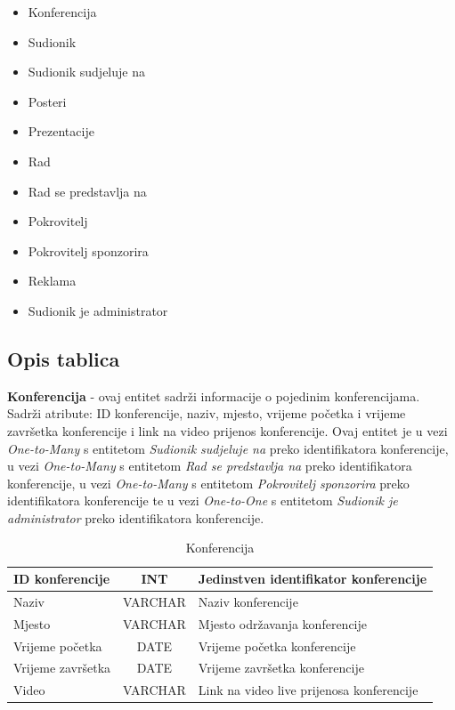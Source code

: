 \begin{itemize}
	\item Konferencija
	\item Sudionik
	\item Sudionik sudjeluje na
	\item Posteri
	\item Prezentacije
	\item Rad
	\item Rad se predstavlja na
	\item Pokrovitelj
	\item Pokrovitelj sponzorira
	\item Reklama
	\item Sudionik je administrator
\end{itemize}
		
			\subsection{Opis tablica}
			

\textbf{Konferencija} - ovaj entitet sadrži informacije o pojedinim konferencijama. Sadrži atribute: ID konferencije, naziv, mjesto, vrijeme početka i vrijeme završetka konferencije i link na video prijenos konferencije. Ovaj entitet je u vezi \textit{One-to-Many} s entitetom \textit{Sudionik sudjeluje na} preko identifikatora konferencije, u vezi \textit{One-to-Many} s entitetom \textit{Rad se predstavlja na} preko identifikatora konferencije, u vezi \textit{One-to-Many} s entitetom \textit{Pokrovitelj sponzorira} preko identifikatora konferencije te u vezi \textit{One-to-One} s entitetom \textit{Sudionik je administrator} preko identifikatora konferencije.

\begin{table}[H]
	\caption{Konferencija}
	\label{tbl:konferencija}
	\centering
	\begin{tabular}{|l|c|l|} 
		\hline
		\cellcolor{lightgreen}ID konferencije & INT & Jedinstven identifikator konferencije\\ 
		\hline
		Naziv & VARCHAR & Naziv konferencije\\ 
		\hline
		Mjesto & VARCHAR & Mjesto održavanja konferencije\\ 
		\hline
		Vrijeme početka & DATE & Vrijeme početka konferencije\\ 
		\hline
		Vrijeme završetka & DATE & Vrijeme završetka konferencije\\ 
		\hline
		Video & VARCHAR & Link na video live prijenosa konferencije\\ 
		\hline
	\end{tabular}
\end{table}

